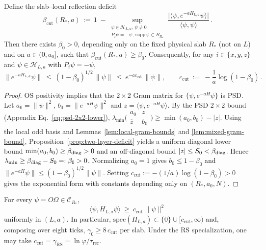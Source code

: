 \documentclass[11pt]{amsart}
\begin{document}
\begin{lemma}\label{lem:odd-contraction-tp}
Define the slab--local reflection deficit
\[
  \beta_{\mathrm{cut}}(R_*,a)
  \,:=\,
  1\;-
  \sup_{\substack{\psi\in\mathcal H_{L,a},\ \psi\ne 0\\ P_i\psi=-\psi,\ \mathrm{supp}\,\psi\subset B_{R_*}}}
  \frac{\big|\langle\psi, e^{-aH_{L,a}}\psi\rangle\big|}{\langle\psi,\psi\rangle}\,.
\]
Then there exists $\beta_0>0$, depending only on the fixed physical slab $R_*$ (not on $L$) and on $a\in(0,a_0]$, such that $\beta_{\mathrm{cut}}(R_*,a)\ge \beta_0$. Consequently, for any $i\in\{x,y,z\}$ and $\psi\in\mathcal{H}_{L,a}$ with $P_i\psi=-\psi$,
\[
  \|e^{-aH_{L,a}}\psi\|\ \le\ (1-\beta_0)^{1/2}\,\|\psi\|\ \le\ e^{-a c_{\mathrm{cut}}}\,\|\psi\|,
  \qquad c_{\mathrm{cut}}\ :=\ -\frac{1}{a}\log(1-\beta_0)\,.
\]
\end{lemma}

\begin{proof}
OS positivity implies that the $2\times 2$ Gram matrix for $\{\psi, e^{-aH}\psi\}$ is PSD. Let $a_0=\|\psi\|^2$, $b_0=\|e^{-aH}\psi\|^2$ and $z=\langle\psi, e^{-aH}\psi\rangle$. By the PSD $2\times 2$ bound (Appendix Eq.~\eqref{eq:psd-2x2-lower}), $\lambda_{\min}\bigl(\begin{smallmatrix} a_0 & z \\ \overline z & b_0 \end{smallmatrix}\bigr)\ge \min(a_0,b_0)-|z|$. Using the local odd basis and Lemmas~\ref{lem:local-gram-bounds} and \ref{lem:mixed-gram-bound}, Proposition~\ref{prop:two-layer-deficit} yields a uniform diagonal lower bound $\min(a_0,b_0)\ge \beta_{\rm diag}>0$ and an off-diagonal bound $|z|\le S_0<\beta_{\rm diag}$. Hence $\lambda_{\min}\ge \beta_{\rm diag}-S_0=:\beta_0>0$. Normalizing $a_0=1$ gives $b_0\le 1-\beta_0$ and $\|e^{-aH}\psi\|\le (1-\beta_0)^{1/2}\|\psi\|$. Setting $c_{\mathrm{cut}}:=-(1/a)\log(1-\beta_0)>0$ gives the exponential form with constants depending only on $(R_*,a_0,N)$.
\end{proof}

\begin{theorem}\label{thm:tp-bound}
For every $\psi=O\Omega\in\mathcal{C}_{R_*}$,
\[
  \langle\psi,H_{L,a}\psi\rangle\ \ge\ c_{\mathrm{cut}}\,\|\psi\|^2
\]
uniformly in $(L,a)$. In particular, $\mathrm{spec}(H_{L,a})\subset\{0\}\cup[c_{\mathrm{cut}},\infty)$ and, composing over eight ticks, $\gamma_0\ge 8\,c_{\mathrm{cut}}$ per slab. Under the RS specialization, one may take $c_{\mathrm{cut}}=\gamma_{\mathrm{RS}}=\ln\varphi/\tau_{\mathrm{rec}}$.
\end{theorem}
\end{document}
